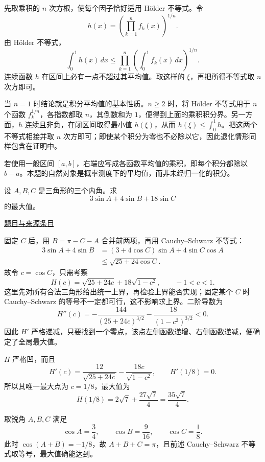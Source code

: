 \documentclass[12pt,fontset=fandol]{ctexart}
\begin{document}
\begin{solve}\label{ans:pre03-math:2}

先取乘积的 $n$ 次方根，使每个因子恰好适用 Hölder 不等式。令
\[
h(x)=\left(\prod_{k=1}^nf_k(x)\right)^{1/n}.
\]
由 Hölder 不等式，
\[
\int_0^1h(x)\,dx
\le\prod_{k=1}^n\left(\int_0^1f_k(x)\,dx\right)^{1/n}.
\]
连续函数 $h$ 在区间上必有一点不超过其平均值。取这样的 $\xi$，再把所得不等式取 $n$ 次方即可。

当 $n=1$ 时结论就是积分平均值的基本性质。$n\ge2$ 时，将 Hölder 不等式用于 $n$ 个函数 $f_k^{1/n}$，各指数都取 $n$，其倒数和为 $1$，便得到上面的乘积积分界。另一方面，$h$ 连续且非负，在闭区间取得最小值 $h(\xi)$，从而 $h(\xi)\le\int_0^1h$。把这两个不等式相接并取 $n$ 次方即可；即使某个积分为零也不必除以它，因此退化情形同样包含在证明中。

\end{solve}

\begin{remark}[方法与条件]若使用一般区间 $[a,b]$，右端应写成各函数平均值的乘积，即每个积分都除以 $b-a$。本题的自然对象是概率测度下的平均值，而非未经归一化的积分。\end{remark}

\begin{example}[来源序号4]\label{ex:pre03-math:4}\label{pr:pre03-math:4}

设 $A,B,C$ 是三角形的三个内角。求
\[
3\sin A+4\sin B+18\sin C
\]
的最大值。

\par\href{https://github.com/lzxcr/cmc-mathematics/blob/64916fa1fdbc3e444a652eca204d5669058ee321/src/problems/preliminary/03/04.md}{题目与来源条目}

\end{example}

\begin{solve}\label{ans:pre03-math:4}

固定 $C$ 后，用 $B=\pi-C-A$ 合并前两项，再用 Cauchy--Schwarz 不等式：
\[
\begin{aligned}
3\sin A+4\sin B
&=(3+4\cos C)\sin A+4\sin C\cos A\\
&\le\sqrt{25+24\cos C}.
\end{aligned}
\]
故令 $c=\cos C$，只需考察
\[
H(c)=\sqrt{25+24c}+18\sqrt{1-c^2},\qquad -1<c<1.
\]
这里先对所有合法三角形给出统一上界，再检验上界能否实现；固定某个 $C$ 时 Cauchy--Schwarz 的等号不一定都可行，这不影响求上界。二阶导数为
\[
H''(c)=-\frac{144}{(25+24c)^{3/2}}-\frac{18}{(1-c^2)^{3/2}}<0.
\]
因此 $H'$ 严格递减，只要找到一个零点，该点左侧函数递增、右侧函数递减，便确定了全局最大值。

$H$ 严格凹，而且
\[
H'(c)=\frac{12}{\sqrt{25+24c}}-\frac{18c}{\sqrt{1-c^2}},
\qquad H'(1/8)=0.
\]
所以其唯一最大点为 $c=1/8$，最大值为
\[
H(1/8)=2\sqrt7+\frac{27\sqrt7}{4}
=\boxed{\frac{35\sqrt7}{4}}.
\]

取锐角 $A,B,C$ 满足
\[
\cos A=\frac34,\qquad \cos B=\frac9{16},\qquad \cos C=\frac18.
\]
此时 $\cos(A+B)=-1/8$，故 $A+B+C=\pi$，且前述 Cauchy--Schwarz 不等式取等号，最大值确能达到。

\end{solve}
\end{document}
